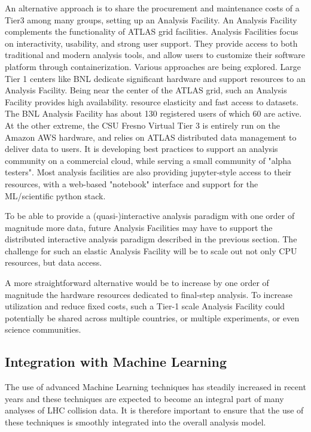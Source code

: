 An alternative approach is to share the procurement and maintenance costs of a Tier3 among many groups, setting up an Analysis Facility. An Analysis Facility complements the functionality of ATLAS grid facilities. Analysis Facilities focus on interactivity, usability, and strong user support. They provide access to both traditional and modern analysis tools, and allow users to customize their software platform through containerization. 
Various approaches are being explored. Large Tier 1 centers like BNL dedicate significant hardware and support resources to an Analysis Facility. Being near the center of the ATLAS grid, such an Analysis Facility provides high availability. resource elasticity and fast access to datasets. The BNL Analysis Facility has about 130 registered users of which 60 are active. At the other extreme, the CSU Fresno Virtual Tier 3 is entirely run on the Amazon AWS hardware, and relies on ATLAS distributed data management to deliver data to users. It is developing best practices to support an analysis community on a commercial cloud, while serving a small community of "alpha testers". Most analysis facilities are also providing jupyter-style access to their resources, with a web-based "notebook" interface and support for the ML/scientific python stack. 

To be able to provide a (quasi-)interactive analysis paradigm with one order of magnitude more data, future Analysis Facilities may have to support the distributed interactive analysis paradigm described in the previous section. The challenge for such an elastic Analysis Facility will be to scale out not only CPU resources, but data access. 

A more straightforward alternative would be to increase by one order of magnitude the hardware resources dedicated to final-step analysis. To increase utilization and reduce fixed costs, such a Tier-1 scale Analysis Facility could potentially be shared across multiple countries, or multiple experiments, or even science communities.

\subsection{Integration with Machine Learning}


The use of advanced Machine Learning techniques has steadily increased in recent years and these techniques are expected to become an integral part of many analyses of LHC collision data. It is therefore important to ensure that the use of these techniques is smoothly integrated into the overall analysis model.

